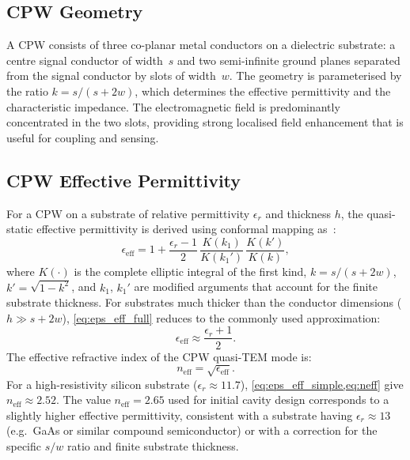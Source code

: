 \documentclass[12pt,a4paper]{article}
\begin{document}
\subsection{CPW Geometry}

A CPW consists of three co-planar metal conductors on a dielectric
substrate: a centre signal conductor of width~$s$ and two semi-infinite
ground planes separated from the signal conductor by slots of width~$w$.
The geometry is parameterised by the ratio $k = s/(s + 2w)$, which
determines the effective permittivity and the characteristic impedance.
The electromagnetic field is predominantly concentrated in the two slots,
providing strong localised field enhancement that is useful for coupling
and sensing.

\subsection{CPW Effective Permittivity}

For a CPW on a substrate of relative permittivity $\epsilon_r$ and
thickness $h$, the quasi-static effective permittivity is derived using
conformal mapping as~\cite{Ghione1987,Simons2001}:
\begin{equation}
    \epsilon_{\mathrm{eff}} = 1 +
    \frac{\epsilon_r - 1}{2}\,
    \frac{K(k_1)}{K(k_1')}\,
    \frac{K(k')}{K(k)},
    \label{eq:eps_eff_full}
\end{equation}
where $K(\cdot)$ is the complete elliptic integral of the first kind,
$k = s/(s+2w)$, $k' = \sqrt{1-k^2}$, and $k_1$, $k_1'$ are modified
arguments that account for the finite substrate thickness. For substrates
much thicker than the conductor dimensions ($h \gg s + 2w$),
\cref{eq:eps_eff_full} reduces to the commonly used approximation:
\begin{equation}
    \epsilon_{\mathrm{eff}} \approx \frac{\epsilon_r + 1}{2}.
    \label{eq:eps_eff_simple}
\end{equation}
The effective refractive index of the CPW quasi-TEM mode is:
\begin{equation}
    n_{\mathrm{eff}} = \sqrt{\epsilon_{\mathrm{eff}}}.
    \label{eq:neff}
\end{equation}
For a high-resistivity silicon substrate ($\epsilon_r \approx 11.7$),
\cref{eq:eps_eff_simple,eq:neff} give $n_{\mathrm{eff}} \approx 2.52$.
The value $n_{\mathrm{eff}} = 2.65$ used for initial cavity design
corresponds to a slightly higher effective permittivity, consistent with
a substrate having $\epsilon_r \approx 13$ (e.g.\ GaAs or similar
compound semiconductor) or with a correction for the specific $s/w$
ratio and finite substrate thickness.
\end{document}
